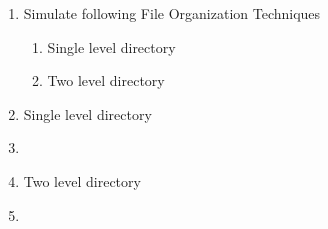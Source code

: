 \documentclass{article}
\newcommand{\question}[2]{
	\item [#1.] #2
}
\newcommand{\answer}[1]{\item[] \inputminted{c}{#1}}
\begin{document}
	\begin{enumerate}[label=\roman*)]
		\question{8}{
			Simulate following File Organization Techniques
			\begin{enumerate}
				\item Single level directory
				\item Two level directory
			\end{enumerate}
		}

		\item Single level directory
		\answer{lab8.sld.c} \newpage

		\item Two level directory
		\answer{lab8.dld.c}
	\end{enumerate}
\end{document}
